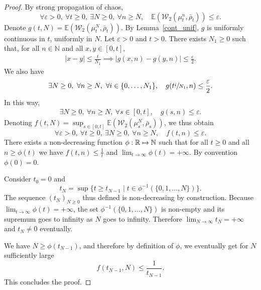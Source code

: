 \documentclass[JEP,XML,SOM,Unicode,published]{cedram}
\newcommand\mto{\mathchoice{\longmapsto}{\mapsto}{\mapsto}{\mapsto}}
\let\epsilon\varepsilon
\let\sep\mid
\theoremstyle{plain}
\theoremstyle{definition}
\begin{document}
\begin{proof}
By strong propagation of chaos,
\begin{equation}\label{Conv_non_unif_base}
\forall \epsilon>0,\ \forall t\geq0,\ \exists N\geq0,\ \forall n\geq N,\quad \mathbb{E}\left(\mathcal{W}_2\left(\mu^n_{t},\bar{\rho}_{t}\right)\right)\leq \epsilon.
\end{equation}
Denote $g(t,N)=\mathbb{E}\left(\mathcal{W}_2\left(\mu^N_{t},\bar{\rho}_{t}\right)\right)$. By Lemma~\ref{cont_unif}, $g$ is uniformly continuous in $t$, uniformly in $N$. Let $\epsilon>0$ and $t>0$. There exists $N_1\geq0$ such that, for all $n\in\mathbb{N}$ and all $x,y\in[0,t]$,
\begin{align*}
|x-y|\leq\frac{t}{N_1}\implies |g(x,n)-g(y,n)|\leq\frac{\epsilon}{2}.
\end{align*}
We also have\vspace*{-3pt}
\[
\exists N\geq0,\ \forall n\geq N,\ \forall i\in \{0,\dots,N_1\},\quad g(t\sfrac{i}{N_1},n)\leq \frac{\epsilon}{2}.
\]
In this way,\vspace*{-3pt}
\begin{align*}
\exists N\geq0,\ \forall n\geq N,\ \forall s\in [0,t],\quad g(s,n)\leq \epsilon.
\end{align*}
Denoting $f(t,N)=\sup_{s\in[0,t]}\mathbb{E}\left(\mathcal{W}_2\left(\mu^N_{s},\bar{\rho}_{s}\right)\right)$, we thus obtain
\begin{equation}\label{Conv_non_unif_sup}
\forall \epsilon>0,\ \forall t\geq0,\ \exists N\geq0,\ \forall n\geq N,\quad f(t,n)\leq \epsilon.
\end{equation}
There exists a non-decreasing function $\phi:\mathbb{R}\mto \mathbb{N}$ such that for all $t\geq0$ and all $n\geq \phi(t)$ we have $f(t,n)\leq\frac{1}{t}$ and $\lim_{t\to\infty}\phi(t)=+\infty$. By convention $\phi(0)=0$.

Consider $t_0=0$ and\vspace*{-3pt}
\[ t_N=\sup\{t\geq t_{N-1}\sep t\in\phi^{-1}(\{0,1,\dots,N\})\}.
\]
The sequence $(t_N)_{N\geq0}$ thus defined is non-decreasing by construction. Because $\lim_{t\to\infty}\phi(t)=+\infty$, the set $\phi^{-1}(\{0,1,\dots,N\})$ is non-empty and its supremum goes to infinity as $N$ goes to infinity. Therefore $\lim_{N\to\infty}t_N=+\infty$ and $t_N\neq0$ eventually.

We have $N\geq\phi(t_{N-1})$, and therefore by definition of $\phi$, we eventually get for $N$ sufficiently large\vspace*{-3pt}
\[
f(t_{N-1},N)\leq\frac{1}{t_{N-1}}.
\]
This concludes the proof.
\end{proof}
\end{document}
